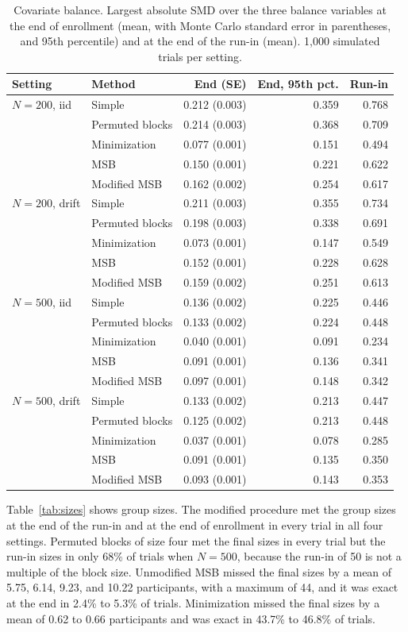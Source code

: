 \documentclass[bib]{statapress}
\begin{document}
\begin{table}[htbp]
\centering
\footnotesize
\caption{Covariate balance. Largest absolute SMD over the three balance
variables at the end of enrollment (mean, with Monte Carlo standard error in
parentheses, and 95th percentile) and at the end of the run-in (mean). 1,000
simulated trials per setting.}
\label{tab:balance}
\begin{tabular}{llrrr}
\hline
Setting & Method & End (SE) & End, 95th pct. & Run-in \\
\hline
$N=200$, iid & Simple & 0.212 (0.003) & 0.359 & 0.768 \\
 & Permuted blocks & 0.214 (0.003) & 0.368 & 0.709 \\
 & Minimization & 0.077 (0.001) & 0.151 & 0.494 \\
 & MSB & 0.150 (0.001) & 0.221 & 0.622 \\
 & Modified MSB & 0.162 (0.002) & 0.254 & 0.617 \\
$N=200$, drift & Simple & 0.211 (0.003) & 0.355 & 0.734 \\
 & Permuted blocks & 0.198 (0.003) & 0.338 & 0.691 \\
 & Minimization & 0.073 (0.001) & 0.147 & 0.549 \\
 & MSB & 0.152 (0.001) & 0.228 & 0.628 \\
 & Modified MSB & 0.159 (0.002) & 0.251 & 0.613 \\
$N=500$, iid & Simple & 0.136 (0.002) & 0.225 & 0.446 \\
 & Permuted blocks & 0.133 (0.002) & 0.224 & 0.448 \\
 & Minimization & 0.040 (0.001) & 0.091 & 0.234 \\
 & MSB & 0.091 (0.001) & 0.136 & 0.341 \\
 & Modified MSB & 0.097 (0.001) & 0.148 & 0.342 \\
$N=500$, drift & Simple & 0.133 (0.002) & 0.213 & 0.447 \\
 & Permuted blocks & 0.125 (0.002) & 0.213 & 0.448 \\
 & Minimization & 0.037 (0.001) & 0.078 & 0.285 \\
 & MSB & 0.091 (0.001) & 0.135 & 0.350 \\
 & Modified MSB & 0.093 (0.001) & 0.143 & 0.353 \\
\hline
\end{tabular}
\end{table}

Table~\ref{tab:sizes} shows group sizes. The modified procedure met the group
sizes at the end of the run-in and at the end of enrollment in every trial in all
four settings. Permuted blocks of size four met the final sizes in every trial
but the run-in sizes in only 68\% of trials when $N = 500$, because the run-in
of 50 is not a multiple of the block size. 
Unmodified MSB missed the final sizes
by a mean of 5.75, 6.14, 9.23, and 10.22 participants, with a maximum of 44, and
it was exact at the end in 2.4\% to 5.3\% of trials. Minimization missed the
final sizes by a mean of 0.62 to 0.66 participants and was exact in 43.7\% to
46.8\% of trials.
\end{document}
